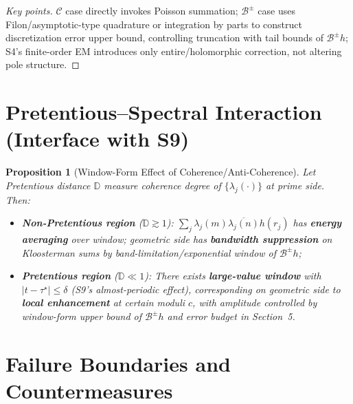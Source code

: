 \documentclass[11pt,a4paper]{article}
\newtheorem{proposition}[theorem]{Proposition}
\theoremstyle{remark}
\begin{document}
\begin{proof}[Key points]
$\mathcal{C}$ case directly invokes Poisson summation; $\mathcal{B}^\pm$ case uses Filon/asymptotic-type quadrature or integration by parts to construct discretization error upper bound, controlling truncation with tail bounds of $\mathcal{B}^\pm h$; S4's finite-order EM introduces only entire/holomorphic correction, not altering pole structure.
\end{proof}

\section{Pretentious--Spectral Interaction (Interface with S9)}

\begin{proposition}[Window-Form Effect of Coherence/Anti-Coherence]\label{prop:pretentious}
Let Pretentious distance $\mathbb{D}$ measure coherence degree of $\{\lambda_j(\cdot)\}$ at prime side. Then:
\begin{itemize}
\item \textbf{Non-Pretentious region} ($\mathbb{D}\gtrsim 1$): $\sum_j \lambda_j(m)\overline{\lambda_j(n)}h(r_j)$ has \textbf{energy averaging} over window; geometric side has \textbf{bandwidth suppression} on Kloosterman sums by band-limitation/exponential window of $\mathcal{B}^\pm h$;

\item \textbf{Pretentious region} ($\mathbb{D}\ll 1$): There exists \textbf{large-value window} with $|t-\tau^\star|\le \delta$ (S9's almost-periodic effect), corresponding on geometric side to \textbf{local enhancement} at certain moduli $c$, with amplitude controlled by window-form upper bound of $\mathcal{B}^\pm h$ and error budget in Section~5.
\end{itemize}
\end{proposition}

\section{Failure Boundaries and Countermeasures}
\end{document}
